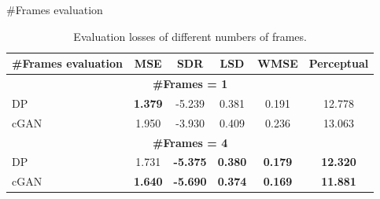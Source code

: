 \documentclass{beamer}
\begin{document}
\begin{frame}{\#Frames evaluation}
    \vspace{-1.8\baselineskip}
    \begin{table}
        \centering
        \caption{Evaluation losses of different numbers of frames.}
        \vspace{-0.5cm}
        \begin{tabular}{l|c|c|c|c|c}
            \hline
            \#Frames evaluation & MSE & SDR & LSD & WMSE & Perceptual \\
            \hline
            \multicolumn{6}{c}{\textbf{\#Frames = 1}}\\
            \hline
            DP & \textbf{1.379} & -5.239 & 0.381 & 0.191 & 12.778 \\
            \hline
            cGAN & 1.950 & -3.930 & 0.409 & 0.236 & 13.063 \\
            \hline
            \multicolumn{6}{c}{\textbf{\#Frames = 4}}\\
            \hline
            DP & 1.731 & \textbf{-5.375} & \textbf{0.380} & \textbf{0.179} & \textbf{12.320} \\
            \hline
            cGAN & \textbf{1.640} & \textbf{-5.690} & \textbf{0.374} & \textbf{0.169} & \textbf{11.881} \\
            \hline
        \end{tabular}
    \end{table}
\end{frame}





\end{document}
